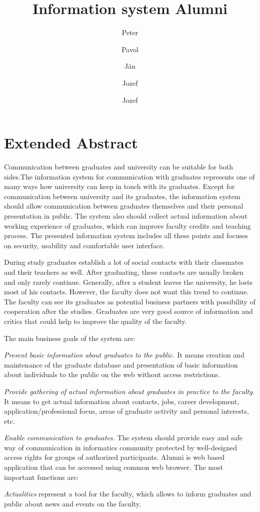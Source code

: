 \documentclass{iitsrc}
\title{Information system Alumni}
\author{Peter}{C\'ich}
\author{Pavol}{F\'abik}
\author{J\'an}{Garaj}
\author{Jozef}{Hergott}
\author{Jozef}{Hopko}
\begin{document}
\section*{Extended Abstract}

Communication between graduates and university can be suitable for both sides.The information system for communication with graduates represents one of many ways how university can keep in touch with its graduates. Except for communication between university and its graduates, the information system should allow communication between graduates themselves and their personal presentation in public. The system also should collect actual information about working experience of graduates, which can improve faculty credits and teaching process. The presented information system includes all these points and focuses on security, usability and comfortable user interface.

During study graduates establish a lot of social contacts with their classmates and their teachers as well. After graduating, these contacts are usually broken and only rarely continue. Generally, after a student leaves the university, he losts most of his contacts. However, the faculty does not want this trend to continue. The faculty can see its graduates as potential business partners with possibility of cooperation after the studies. Graduates are very good source of information and critics that could help to improve the quality of the faculty.

The main business goals of the system are:

{\em Present basic information about graduates to the public.}
It means creation and maintenance of the graduate database and presentation of basic information about individuals to the public on the web without access restrictions.

{\em Provide gathering of actual information about graduates in practice to the faculty.} 
It means to get actual information about contacts, jobs, career development, application/professional focus, areas of graduate activity and personal interests, etc.

{\em Enable communication to graduates.}
The system should provide easy and safe way of communication in informatics community protected by well-designed access rights for groups of authorized participants.
Alumni is web based application that can be accessed using common web browser. The most important functions are:

{\em Actualities} 
represent a tool for the faculty, which allows to inform graduates and public about news and events on the faculty.
\end{document}
